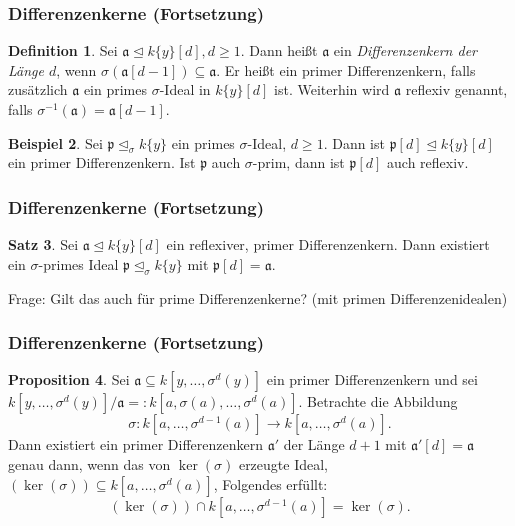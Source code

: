 \documentclass{beamer}
\def\a{\mathfrak{a}}
\def\p{\mathfrak{p}}
\def\s{\sigma}
\def\si{\unlhd_{\sigma}}
\theoremstyle{definition}
\newtheorem{satz}{Satz}[section]
\newtheorem{ex}[satz]{Beispiel}
\newtheorem{prop}[satz]{Proposition}
\newtheorem{defn}[satz]{Definition}
\begin{document}
\begin{frame}\frametitle{Differenzenkerne (Fortsetzung)}
\begin{defn}
Sei $\a \unlhd k\{y\}[d], d \geq 1$. Dann heißt $\a$ ein \emph{Differenzenkern der Länge $d$}, wenn $\s(\a[d-1]) \subseteq \a$. Er heißt ein primer Differenzenkern, falls zusätzlich $\a$ ein primes $\s$-Ideal in $k\{y\}[d]$ ist.
Weiterhin wird $\a$ reflexiv genannt, falls $\s^{-1}(\a) = \a[d-1]$. 
\end{defn}
\begin{ex}
Sei $\p \si k\{y\}$ ein primes $\s$-Ideal, $d \geq 1$. Dann ist $\p[d] \unlhd k\{y\}[d]$ ein primer Differenzenkern. 
Ist $\p$ auch $\s$-prim, dann ist $\p[d]$ auch reflexiv.
\end{ex}
\end{frame}

\begin{frame}\frametitle{Differenzenkerne (Fortsetzung)}
\begin{satz}
Sei $\a \unlhd k\{y\}[d]$ ein reflexiver, primer Differenzenkern. Dann existiert ein $\s$-primes Ideal $\p \si k\{y\}$
mit $\p[d] = \a$.
\end{satz}
$\phantom{ }$ \\
Frage: Gilt das auch für prime Differenzenkerne? (mit primen Differenzenidealen)
\end{frame}

\begin{frame}\frametitle{Differenzenkerne (Fortsetzung)}
\begin{prop}
Sei $\a \subseteq k[y,\ldots,\s^d(y)]$ ein primer Differenzenkern und sei $k[y,\ldots,\s^d(y)]/\a =: k[a,\s(a),\ldots,\s^d(a)]$. Betrachte die Abbildung
\[ \s: k[a,\ldots,\s^{d-1}(a)] \rightarrow k[a,\ldots,\s^d(a)]. \]
Dann existiert ein primer Differenzenkern $\a'$ der Länge $d+1$ mit $\a'[d] = \a$ genau dann, wenn das von $\operatorname{ker}(\s)$ erzeugte Ideal, $(\operatorname{ker}(\s)) \subseteq k[a,\ldots,\s^d(a)]$, Folgendes erfüllt:
 \begin{equation*} (\operatorname{ker}(\s)) \cap k[a,\ldots,\s^{d-1}(a)] = \operatorname{ker}(\s).\end{equation*} 
\end{prop}
\end{frame}
\end{document}
